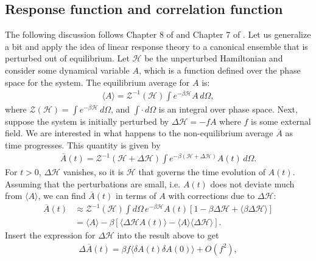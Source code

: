 \documentclass[reprint,
nofootinbib,
amsmath,amssymb,
aps]{revtex4-1}
\newcommand{\be}{\beta}
\newcommand{\f}[2]{\frac{#1}{#2}}
\newcommand{\lb}{\left[}
\newcommand{\rb}{\right]}
\begin{document}
\subsection{Response function and correlation function}
The following discussion follows  Chapter 8 of \cite{chandler1988introduction} and Chapter 7 of \cite{chaikin1995principles}. Let us generalize a bit and apply the idea of linear response theory to a canonical ensemble that is perturbed out of equilibrium. Let $\mathcal{H}$ be the unperturbed Hamiltonian and consider some dynamical variable $A$, which is a function defined over the phase space for the system. The equilibrium average for $A$ is:
\begin{align*}
\langle A \rangle =  \mathcal{Z}^{-1}(\mathcal{H}) \int e^{-\be \mathcal{H}} A\, d\Omega,
\end{align*}
where $\mathcal{Z}(\mathcal{H}) = \int e^{-\be \mathcal{H}} \, d\Omega$, and $\int \cdot \,d\Omega$ is an integral over phase space. Next, suppose the system is initially perturbed by $\Delta \mathcal{H} = -f A$ where $f$ is some external field. We are interested in what happens to the non-equilibrium average $\overline{A}$ as time progresses. This quantity is given by 
\begin{align*}
\overline{A}(t) = \mathcal{Z}^{-1}(\mathcal{H} + \Delta \mathcal{H})  \int e^{-\be(\mathcal{H} + \Delta \mathcal{H})} A(t) \, d\Omega. 
\end{align*}
For $t>0$, $\Delta \mathcal{H}$ vanishes, so it is $\mathcal{H}$ that governs the time evolution of $A(t)$. Assuming that the perturbations are small, i.e. $A(t)$ does not deviate much from $\langle A \rangle$, we can find $\overline{A}(t)$ in terms of $A$ with corrections due to $\Delta \mathcal{H}$:
\begin{align*}
\overline{A}(t) 
&\approx \mathcal{Z}^{-1}(\mathcal{H})  \int d\Omega \, e^{-\be \mathcal{H}} A(t)   \lb 1 - \be \Delta \mathcal{H}  + \langle  \be \Delta \mathcal{H}  \rangle  \rb \\ 
&= \langle A \rangle - \be \lb \langle \Delta \mathcal{H} A(t) \rangle - \langle A \rangle \langle \Delta \mathcal{H} \rangle  \rb.
\end{align*}
Insert the expression for $\Delta \mathcal{H}$ into the result above to get
\begin{align}
\label{eq:fluctuation}
\Delta \overline{A}(t) = \be f \langle \delta A(t) \delta A(0) \rangle + {O}(f^2),
\end{align}
\end{document}
